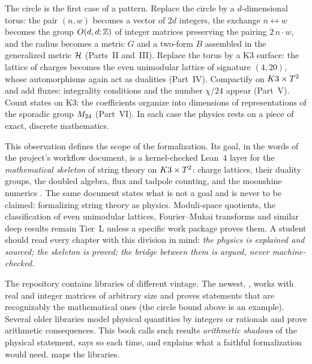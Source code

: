 The circle is the first case of a pattern. Replace the circle by a $d$-dimensional torus: the
pair $(n,w)$ becomes a vector of $2d$ integers, the exchange $n\leftrightarrow w$ becomes the
group $O(d,d;\mathbb{Z})$ of integer matrices preserving the pairing $2\,n\!\cdot\! w$, and the radius
becomes a metric $G$ and a two-form $B$ assembled in the generalized metric $\mathcal{H}$
(Parts~II and~III). Replace the torus by a K3 surface: the lattice of charges becomes the
even unimodular lattice of signature $(4,20)$, whose automorphisms again act as dualities
(Part~IV). Compactify on $K3\times T^2$ and add fluxes: integrality conditions and the number
$\chi/24$ appear (Part~V). Count states on K3: the coefficients organize into dimensions of
representations of the sporadic group $M_{24}$ (Part~VI). In each case the physics rests on a
piece of exact, discrete mathematics.

This observation defines the scope of the formalization. Its goal, in the words of the
project's workflow document, is a kernel-checked Lean~4 layer for the \emph{mathematical
skeleton} of string theory on $K3\times T^2$: charge lattices, their duality groups, the doubled
algebra, flux and tadpole counting, and the moonshine numerics
. The same document states what is not a goal and is
never to be claimed: formalizing string theory as physics. Moduli-space quotients, the
classification of even unimodular lattices, Fourier--Mukai transforms and similar deep
results remain Tier~L unless a specific work package proves them. A student should read every
chapter with this division in mind: \emph{the physics is explained and sourced; the skeleton
is proved; the bridge between them is argued, never machine-checked.}

\begin{remark}\label{rem:intro:shadows}
The repository contains libraries of different vintage. The newest, ,
works with real and integer matrices of arbitrary size and proves statements that are
recognizably the mathematical ones (the circle bound above is an example). Several older
libraries model physical quantities by integers or rationals and prove arithmetic
consequences. This book calls such results \emph{arithmetic shadows}
of the physical statement, says so each time, and explains what a faithful formalization
would need.  maps the libraries.
\end{remark}

